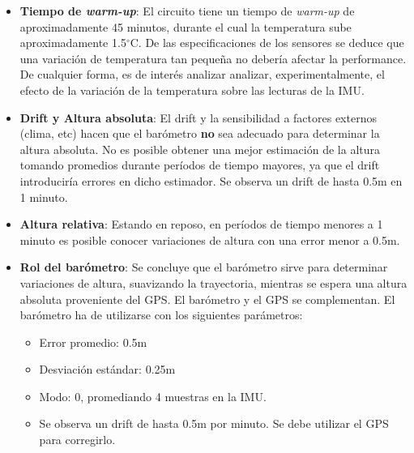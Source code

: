 \documentclass[main]{subfiles}
\newcommand{\degc}{$^\circ$C}
\begin{document}
\begin{itemize}
\item \textbf{Tiempo de \textit{warm-up}}: El circuito tiene un tiempo de \textit{warm-up} de aproximadamente 45 minutos, durante el cual la temperatura sube aproximadamente 1.5\degc. De las especificaciones de los sensores se deduce que una variaci\'on de temperatura tan peque\~na no deber\'ia afectar la performance. De cualquier forma, es de inter\'es analizar analizar, experimentalmente, el efecto de la variaci\'on de la temperatura sobre las lecturas de la IMU.
\item \textbf{Drift y Altura absoluta}: El drift y la sensibilidad a factores externos (clima, etc) hacen que el bar\'ometro \textbf{no} sea adecuado para determinar la altura absoluta. No es posible obtener una mejor estimaci\'on de la altura tomando promedios durante per\'iodos de tiempo mayores, ya que el drift introducir\'ia errores en dicho estimador. Se observa un drift de hasta 0.5m en 1 minuto.
\item \textbf{Altura relativa}: Estando en reposo, en per\'iodos de tiempo menores a 1 minuto es posible conocer variaciones de altura con una error menor a 0.5m.
\item \textbf{Rol del bar\'ometro}: Se concluye que el bar\'ometro sirve para determinar variaciones de altura, suavizando la trayectoria, mientras se espera una altura absoluta proveniente del GPS. El bar\'ometro y el GPS se complementan. El bar\'ometro ha de utilizarse con los siguientes par\'ametros:
  \begin{itemize}
  \item Error promedio: 0.5m
  \item Desviaci\'on est\'andar: 0.25m
  \item Modo: 0, promediando 4 muestras en la IMU.
  \item Se observa un drift de hasta 0.5m por minuto. Se debe utilizar el GPS para corregirlo.
  \end{itemize}
\end{itemize}
\end{document}
